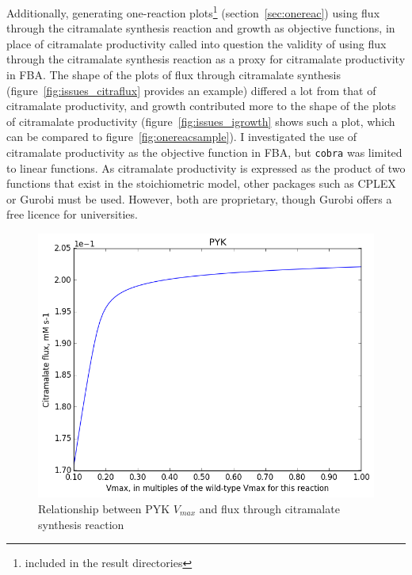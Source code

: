 \documentclass[parskip=full, numbers=noenddot]{scrreprt}
\begin{document}
Additionally, generating one-reaction plots\footnote{included in the result directories} (section~\ref{sec:onereac}) using flux through the citramalate synthesis reaction and growth as objective functions, in place of citramalate productivity called into question the validity of using flux through the citramalate synthesis reaction as a proxy for citramalate productivity in FBA. The shape of the plots of flux through citramalate synthesis (figure~\vref{fig:issues_citraflux} provides an example) differed a lot from that of citramalate productivity, and growth contributed more to the shape of the plots of citramalate productivity (figure~\vref{fig:issues_igrowth} shows such a plot, which can be compared to figure~\vref{fig:onereacsample}). I investigated the use of citramalate productivity as the objective function in FBA, but \texttt{cobra} was limited to linear functions. As citramalate productivity is expressed as the product of two functions that exist in the stoichiometric model, other packages such as CPLEX or Gurobi must be used. However, both are proprietary, though Gurobi offers a free licence for universities.

\begin{figure}[htbp]
  \centering
  \includegraphics[scale=0.5]{issues_citraflux}
  \caption{Relationship between PYK $V_{max}$ and flux through citramalate synthesis reaction}
  \label{fig:issues_citraflux}
\end{figure}
\end{document}
